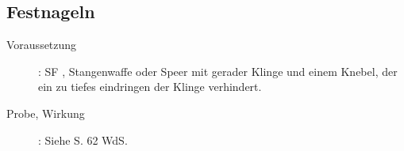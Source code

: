 \subsection{Festnageln}
\label{aktion.festnageln}
\begin{description}
    \item[Voraussetzung]:
        SF , Stangenwaffe oder Speer mit gerader Klinge und einem Knebel, der ein zu tiefes eindringen der Klinge verhindert.
    \item[Probe, Wirkung]:
        Siehe S. 62 WdS.
\end{description}
